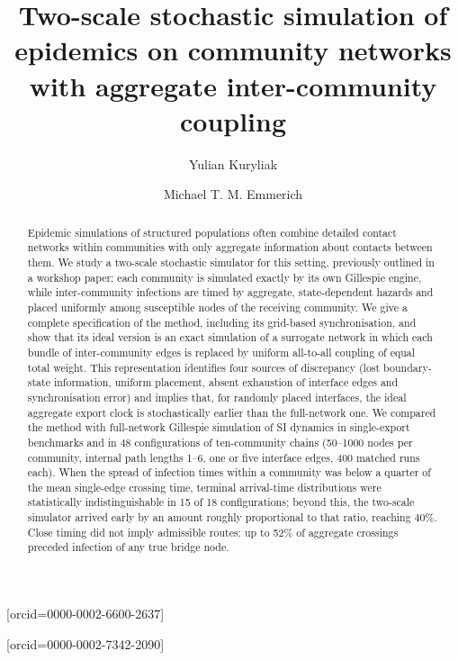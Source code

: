 \documentclass[a4paper,fleqn]{cas-sc}
\begin{document}
\let\WriteBookmarks\relax
\def\floatpagepagefraction{1}
\def\textpagefraction{.001}


\title[mode=title]{Two-scale stochastic simulation of epidemics on community networks with aggregate inter-community coupling}

\author[1]{Yulian Kuryliak}[orcid=0000-0002-6600-2637]
\cormark[1]

\author[2]{Michael T. M. Emmerich}[orcid=0000-0002-7342-2090]


\begin{abstract}
Epidemic simulations of structured populations often combine detailed contact networks within communities with only aggregate information about contacts between them. We study a two-scale stochastic simulator for this setting, previously outlined in a workshop paper: each community is simulated exactly by its own Gillespie engine, while inter-community infections are timed by aggregate, state-dependent hazards and placed uniformly among susceptible nodes of the receiving community. We give a complete specification of the method, including its grid-based synchronisation, and show that its ideal version is an exact simulation of a surrogate network in which each bundle of inter-community edges is replaced by uniform all-to-all coupling of equal total weight. This representation identifies four sources of discrepancy (lost boundary-state information, uniform placement, absent exhaustion of interface edges and synchronisation error) and implies that, for randomly placed interfaces, the ideal aggregate export clock is stochastically earlier than the full-network one. We compared the method with full-network Gillespie simulation of SI dynamics in single-export benchmarks and in 48 configurations of ten-community chains (50--1000 nodes per community, internal path lengths 1--6, one or five interface edges, 400 matched runs each). When the spread of infection times within a community was below a quarter of the mean single-edge crossing time, terminal arrival-time distributions were statistically indistinguishable in 15 of 18 configurations; beyond this, the two-scale simulator arrived early by an amount roughly proportional to that ratio, reaching 40\%. Close timing did not imply admissible routes: up to 52\% of aggregate crossings preceded infection of any true bridge node.
\end{abstract}
\end{document}

